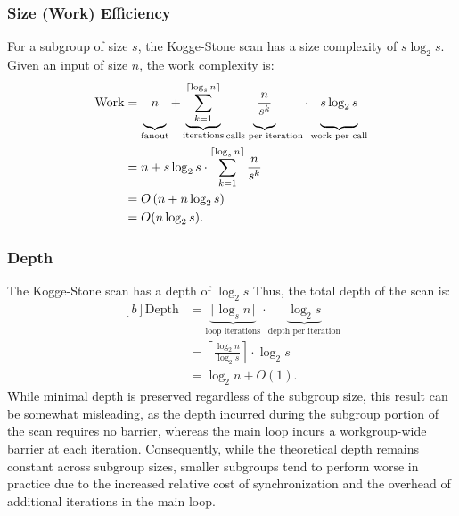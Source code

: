 \documentclass[sigconf]{acmart}
\begin{document}
\subsubsection{Size (Work) Efficiency}
For a subgroup of size $s$, the Kogge-Stone scan has a size complexity of $s \log_2 s$. Given an input of size $n$, the work complexity is:
\begin{equation}
  \begin{aligned}[b]
    \text{Work} & = \underbrace{\vphantom{\sum_{k=0}^{\lceil \log_s n \rceil}}n}_{\text{fanout}}
    +
    \underbrace{\sum_{k=1}^{\lceil \log_s n \rceil}}_{\text{iterations}}
    \underbrace{\vphantom{\sum_{k=1}^{\lceil \log_s n \rceil}}\frac{n}{s^k}}_{\text{calls per iteration}}
    \cdot
    \underbrace{\vphantom{\sum_{k=1}^{\lceil \log_s n \rceil}}s \log_2 s}_{\text{work per call}} \\
                & = n + s \log_2 s \cdot \sum_{k=1}^{\lceil \log_s n \rceil} \frac{n}{s^k}       \\
                & = O\left(n + n \log_2 s\right)                                                 \\
                & = O(n \log_2 s).
  \end{aligned}
\end{equation}

\subsubsection{Depth}
The Kogge-Stone scan has a depth of $\log_2 s$ Thus, the total depth of the scan is:
\begin{equation}
  \begin{aligned}[b]
    \text{Depth} & = \underbrace{\lceil \log_s n \rceil}_{\text{loop iterations}}
    \cdot \underbrace{\log_2 s}_{\text{depth per iteration}}                           \\
                 & = \left\lceil \frac{\log_2 n}{\log_2 s} \right\rceil \cdot \log_2 s \\
                 & = \log_2 n + O(1).
  \end{aligned}
\end{equation}
While minimal depth is preserved regardless of the subgroup size, this result can be somewhat misleading, as the depth incurred during the subgroup portion of the scan requires no barrier, whereas the main loop incurs a workgroup-wide barrier at each iteration. Consequently, while the theoretical depth remains constant across subgroup sizes, smaller subgroups tend to perform worse in practice due to the increased relative cost of synchronization and the overhead of additional iterations in the main loop.
\end{document}
